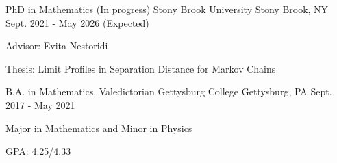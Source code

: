 
\begin{cventries}

	\cventryedu
		{PhD in Mathematics (In progress)} %
		{Stony Brook University} %
		{Stony Brook, NY} %
		{Sept. 2021 - May 2026 (Expected)} %
		{ %
			\begin{cvitems}
				\item Advisor: Evita Nestoridi
				\item Thesis: Limit Profiles in Separation Distance for Markov Chains
			\end{cvitems}
		}

	\cventryedu
		{B.A. in Mathematics, Valedictorian} %
		{Gettysburg College} %
		{Gettysburg, PA} %
		{Sept. 2017 - May 2021} %
		{ %
			\begin{cvitems}
				\item Major in Mathematics and Minor in Physics
				\item GPA: 4.25/4.33
			\end{cvitems}
		}



\end{cventries}
